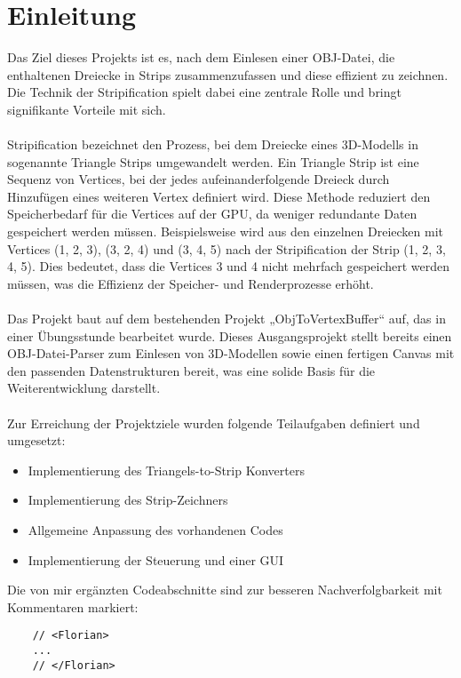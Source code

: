 \chapter{Einleitung}

Das Ziel dieses Projekts ist es, nach dem Einlesen einer OBJ-Datei, die
enthaltenen Dreiecke in Strips zusammenzufassen und diese effizient zu zeichnen.
Die Technik der Stripification spielt dabei eine zentrale Rolle und bringt
signifikante Vorteile mit sich.
\\
\\
Stripification bezeichnet den Prozess, bei dem Dreiecke eines 3D-Modells in
sogenannte Triangle Strips umgewandelt werden. Ein Triangle Strip ist eine
Sequenz von Vertices, bei der jedes aufeinanderfolgende Dreieck durch Hinzufügen
eines weiteren Vertex definiert wird. Diese Methode reduziert den Speicherbedarf
für die Vertices auf der GPU, da weniger redundante Daten gespeichert werden
müssen. Beispielsweise wird aus den einzelnen Dreiecken mit Vertices (1, 2, 3),
(3, 2, 4) und (3, 4, 5) nach der Stripification der Strip (1, 2, 3, 4, 5). Dies
bedeutet, dass die Vertices 3 und 4 nicht mehrfach gespeichert werden müssen,
was die Effizienz der Speicher- und Renderprozesse erhöht. 
\\
\\
Das Projekt baut auf dem bestehenden Projekt „ObjToVertexBuffer“ auf, das in
einer Übungsstunde bearbeitet wurde. Dieses Ausgangsprojekt stellt bereits einen
OBJ-Datei-Parser zum Einlesen von 3D-Modellen sowie einen fertigen Canvas mit
den passenden Datenstrukturen bereit, was eine solide Basis für die
Weiterentwicklung darstellt.
\\
\\
Zur Erreichung der Projektziele wurden folgende Teilaufgaben definiert und
umgesetzt:
\begin{itemize}
    \item Implementierung des Triangels-to-Strip Konverters
    \item Implementierung des Strip-Zeichners
    \item Allgemeine Anpassung des vorhandenen Codes
    \item Implementierung der Steuerung und einer GUI
\end{itemize}
\hfil \break
Die von mir ergänzten Codeabschnitte sind zur besseren Nachverfolgbarkeit mit
Kommentaren markiert:

\begin{lstlisting}
    // <Florian>
    ...
    // </Florian>
\end{lstlisting}